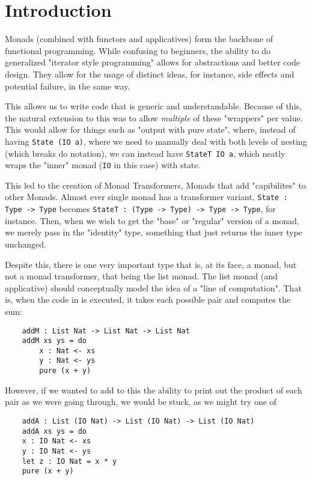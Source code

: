 \section{Introduction} 

Monads (combined with functors and applicatives) form the backbone of functional programming.
While confusing to beginners, the ability to do generalized "iterator style programming" allows for abstractions and better code design. \cite{monads}
They allow for the usage of distinct ideas, for instance, side effects and potential failure, in the same way.

This allows us to write code that is generic and understandable.
Because of this, the natural extension to this was to allow \emph{multiple} of these "wrappers" per value.
This would allow for things such as "output with pure state", where, instead of having \verb|State (IO a)|, where we need to manually deal with both levels of nesting (which breaks do notation), we can instead have \verb|StateT IO a|, which neatly wraps the "inner" monad (\verb|IO| in this case) with state.

This led to the creation of Monad Transformers, Monads that add "capibilites" to other Monads.
Almost ever single monad has a transformer variant, \verb|State : Type -> Type| becomes \verb|StateT : (Type -> Type) -> Type -> Type|, for instance.
Then, when we wish to get the "base" or "regular" version of a monad, we merely pass in the "identity" type, something that just returns the inner type unchanged.

Despite this, there is one very important type that is, at its face, a monad, but not a monad transformer, that being the list monad.
The list monad (and applicative) should conceptually model the idea of a "line of computation".
That is, when the code in  is executed, it takes each possible pair and computes the sum:

\begin{verbatim}
	addM : List Nat -> List Nat -> List Nat
	addM xs ys = do 
		x : Nat <- xs
		y : Nat <- ys 
		pure (x + y)
\end{verbatim}

However, if we wanted to add to this the ability to print out the product of each pair as we were going through, we would be stuck, as we might try one of  

\begin{verbatim}
	addA : List (IO Nat) -> List (IO Nat) -> List (IO Nat)
	addA xs ys = do 
	x : IO Nat <- xs
	y : IO Nat <- ys 
	let z : IO Nat = x * y
	pure (x + y)
\end{verbatim}
